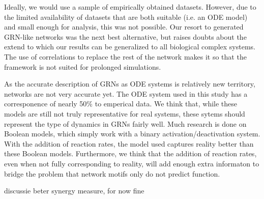 \documentclass[../main.tex]{subfiles}
\begin{document}
Ideally, we would use a sample of empirically obtained datasets.
However, due to the limited availability of datasets that are both suitable (i.e. an ODE model) and small enough for analysis, this was not possible.
Our resort to generated GRN-like networks was the next best alternative, but raises doubts about the extend to which our results can be generalized to all biological complex systems.
The use of correlations to replace the rest of the network makes it so that the framework is not suited for prolonged simulations.

As the accurate description of GRNs as ODE systems is relatively new territory, networks are not very accurate yet.
The ODE system used in this study has a corresponence of nearly 50\% to emperical data.
We think that, while these models are still not truly representative for real systems, these sytems should represent the type of dynamics in GRNs fairly well.
Much research is done on Boolean models, which simply work with a binary activation/deactivation system.
With the addition of reaction rates, the model used captures reality better than these Boolean models.
Furthermore, we think that the addition of reaction rates, even when not fully corresponding to reality, will add enough extra informaton to bridge the problem that network motifs only do not predict function.




discussie beter synergy measure, for now fine
\end{document}
